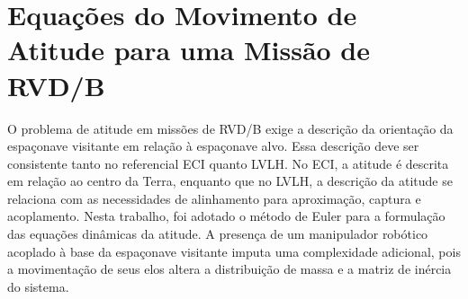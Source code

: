 \section{Equações do Movimento de Atitude para uma Missão de RVD/B}
\label{sec:equacoes_movimento_atitude}

O problema de atitude em missões de RVD/B exige a descrição da orientação da espaçonave visitante em relação à espaçonave alvo.
Essa descrição deve ser consistente tanto no referencial ECI quanto LVLH.
No ECI, a atitude é descrita em relação ao centro da Terra, enquanto que no LVLH, a descrição da atitude se relaciona com as necessidades de alinhamento para aproximação, captura e acoplamento.
Nesta trabalho, foi adotado o método de Euler para a formulação das equações dinâmicas da atitude.
A presença de um manipulador robótico acoplado à base da espaçonave visitante imputa uma complexidade adicional, pois a movimentação de seus elos altera a distribuição de massa e a matriz de inércia do sistema.




